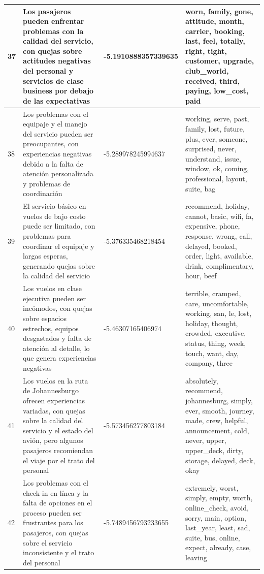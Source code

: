 \documentclass{report}
\begin{document}
\begin{longtable}{|p{1cm}|p{4cm}|p{4cm}|p{6cm}|}
                    \hline
                    37 & Los pasajeros pueden enfrentar problemas con la calidad del servicio, con quejas sobre actitudes negativas del personal y servicios de clase business por debajo de las expectativas & -5.1910888357339635 & worn, family, gone, attitude, month, carrier, booking, last, feel, totally, right, tight, customer, upgrade, club\_world, received, third, paying, low\_cost, paid \\
                    \hline
                    38 & Los problemas con el equipaje y el manejo del servicio pueden ser preocupantes, con experiencias negativas debido a la falta de atención personalizada y problemas de coordinación & -5.289978245994637 & working, serve, past, family, lost, future, plus, ever, someone, surprised, never, understand, issue, window, ok, coming, professional, layout, suite, bag \\
                    \hline
                    39 & El servicio básico en vuelos de bajo costo puede ser limitado, con problemas para coordinar el equipaje y largas esperas, generando quejas sobre la calidad del servicio & -5.376335468218454 & recommend, holiday, cannot, basic, wifi, fa, expensive, phone, response, wrong, call, delayed, booked, order, light, available, drink, complimentary, hour, beef \\
                    \hline
                    40 & Los vuelos en clase ejecutiva pueden ser incómodos, con quejas sobre espacios estrechos, equipos desgastados y falta de atención al detalle, lo que genera experiencias negativas & -5.46307165406974 & terrible, cramped, care, uncomfortable, working, san, le, lost, holiday, thought, crowded, executive, status, thing, week, touch, want, day, company, three \\
                    \hline
                    41 & Los vuelos en la ruta de Johannesburgo ofrecen experiencias variadas, con quejas sobre la calidad del servicio y el estado del avión, pero algunos pasajeros recomiendan el viaje por el trato del personal & -5.573456277803184 & absolutely, recommend, johannesburg, simply, ever, smooth, journey, made, crew, helpful, announcement, cold, never, upper, upper\_deck, dirty, storage, delayed, deck, okay \\
                    \hline
                    42 & Los problemas con el check-in en línea y la falta de opciones en el proceso pueden ser frustrantes para los pasajeros, con quejas sobre el servicio inconsistente y el trato del personal & -5.7489456793233655 & extremely, worst, simply, empty, worth, online\_check, avoid, sorry, main, option, last\_year, least, sad, suite, bus, online, expect, already, case, leaving \\

\end{longtable}
\end{document}
